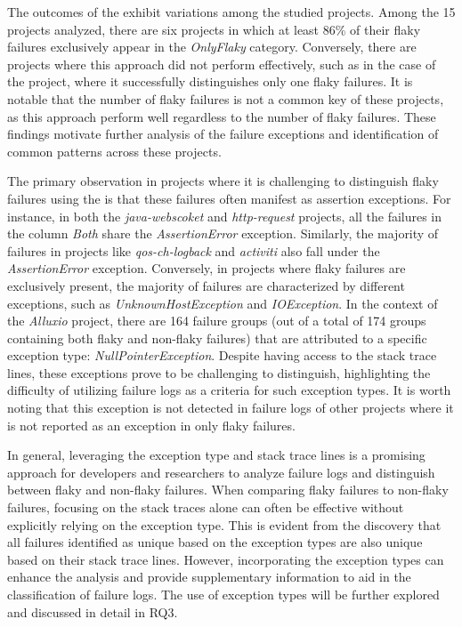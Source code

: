 The outcomes of the \syntax exhibit variations among the studied projects. Among the 15 projects analyzed, there are six projects in which at least 86\% of their flaky failures exclusively appear in the \emph{OnlyFlaky} category. Conversely, there are projects where this approach did not perform effectively, such as in the case of the \httpcore project, where it successfully distinguishes only one flaky failures. It is notable that the number of flaky failures is not a common key of these projects, as this approach perform well regardless to the number of flaky failures. These findings motivate further analysis of the failure exceptions and identification of common patterns across these projects.

The primary observation in projects where it is challenging to distinguish flaky failures using the \syntax is that these failures often manifest as assertion exceptions. For instance, in both the \emph{java-webscoket} and \emph{http-request} projects, all the failures in the column \emph{Both} share the \textit{AssertionError} exception. Similarly, the majority of failures in projects like \emph{qos-ch-logback} and \emph{activiti} also fall under the \textit{AssertionError} exception.
Conversely, in projects where flaky failures are exclusively present, the majority of failures are characterized by different exceptions, such as \emph{UnknownHostException} and \emph{IOException}. 
In the context of the \emph{Alluxio} project, there are 164 failure groups (out of a total of 174 groups containing both flaky and non-flaky failures) that are attributed to a specific exception type: \emph{NullPointerException}. Despite having access to the stack trace lines, these exceptions prove to be challenging to distinguish, highlighting the difficulty of utilizing failure logs as a criteria for such exception types. It is worth noting that this exception is not detected in failure logs of other projects where it is not reported as an exception in only flaky failures.

In general, leveraging the exception type and stack trace lines is a promising approach for developers and researchers to analyze failure logs and distinguish between flaky and non-flaky failures. When comparing flaky failures to non-flaky failures, focusing on the stack traces alone can often be effective without explicitly relying on the exception type. This is evident from the discovery that all failures identified as unique based on the exception types are also unique based on their stack trace lines. However, incorporating the exception types can enhance the analysis and provide supplementary information to aid in the classification of failure logs. The use of exception types will be further explored and discussed in detail in RQ3.

